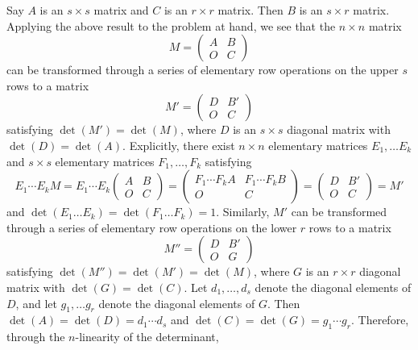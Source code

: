 \documentclass[12pt]{article}
\begin{document}
\begin{enumerate}
Say $A$ is an $s \times s$ matrix and $C$ is an $r \times r$ matrix. Then $B$ is an $s \times r$ matrix. Applying the above result to the problem at hand, we see that the $n \times n$ matrix
\begin{equation*}
M = \begin{pmatrix}
A & B \\
O & C
\end{pmatrix}
\end{equation*}
can be transformed through a series of elementary row operations on the upper $s$ rows to a matrix
\begin{equation*}
M' = \begin{pmatrix}
D & B' \\
O & C
\end{pmatrix}
\end{equation*}
satisfying $\det(M') = \det(M)$, where $D$ is an $s \times s$ diagonal matrix with $\det(D) = \det(A)$. Explicitly, there exist $n \times n$ elementary matrices $E_1, \dots E_k$ and $s \times s$ elementary matrices $F_1, \dots, F_k$ satisfying
\begin{equation*}
E_1 \cdots E_k M
= E_1 \cdots E_k \begin{pmatrix}
A & B \\
O & C
\end{pmatrix}
= \begin{pmatrix}
F_1 \cdots F_k A & F_1 \cdots F_k B \\
O & C
\end{pmatrix}
= \begin{pmatrix}
D & B' \\
O & C
\end{pmatrix}
= M'
\end{equation*}
and $\det(E_1 \dots E_k) = \det(F_1 \dots F_k) = 1$. Similarly, $M'$ can be transformed through a series of elementary row operations on the lower $r$ rows to a matrix
\begin{equation*}
M'' = \begin{pmatrix}
D & B' \\
O & G
\end{pmatrix}
\end{equation*}
satisfying $\det(M'') = \det(M') = \det(M)$, where $G$ is an $r \times r$ diagonal matrix with $\det(G) = \det(C)$. Let $d_1, \dots, d_s$ denote the diagonal elements of $D$, and let $g_1, \dots g_r$ denote the diagonal elements of $G$. Then $\det(A) = \det(D) = d_1 \cdots d_s$ and $\det(C) = \det(G) = g_1 \cdots g_r$. Therefore, through the $n$-linearity of the determinant,

\end{enumerate}
\end{document}
